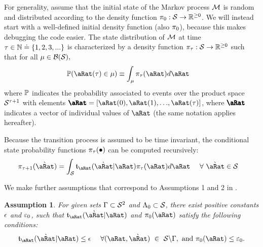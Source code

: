 \documentclass[\econtexRoot/BufferStockTheory.tex]{subfiles}
\begin{document}
For generality, \cite{saDiscrete,saQuantitative} assume that  the initial state of the Markov process $\mathcal{M}$ is random and distributed according to the density function $\pi_{0} : \mathcal{S} \rightarrow \mathbb{R}^{\geq 0}$.  We will instead start with a well-defined initial density function (also $\pi_{0}$), because this makes debugging the code easier.  The state distribution of $\mathcal{M}$ at time $\tau \in \mathbb{N} \doteq  \{1,2,3,...\}$ is characterized by a density function $\pi_{\tau} : \mathcal{S} \rightarrow \mathbb{R}^{\geq 0}$ such that for all $\mu \in \mathcal{B}({\mathcal{S}}),$
\begin{align}
  \PrbEvntSqnc(\pnt(\tAbs) \in \SetPartCnts) & \equiv \int_{\SetPartCnts} \DnsPnt_{\tAbs}(\pnt)d\pnt
\end{align}
where $\mathbb{P}$ indicates the probability associated to events over the product space $\mathcal{S}^{\tau+1}$ with elements $\vctr{\pnt}=[\pnt(0),\pnt(1),{\dots},\pnt(\tAbs)]$, where $\vctr{\pnt}$ indicates a vector of individual values of $\pnt$ (the same notation applies hereafter).

Because the transition process is assumed to be time invariant, the conditional state probability functions $\pi_{\tau}(\bullet)$ can be computed recursively:
\begin{align}
  \DnsPnt_{\tAbs+1}(\Nxt{\pnt}) &= \int_{\SetFullCnts} \DnsPntNxtFmPntNow_{\pnt}(\Nxt{\pnt}|\pnt)\DnsPnt_{\tAbs}(\pnt)d\pnt ~~~~ \forall~\Nxt{\pnt} \in \SetFullCnts \label{eq:stateDensity}
\end{align}

We make further assumptions that correspond to Assumptions 1 and 2 in \cite{saDiscrete}.


\theoremstyle{plain}
\newtheorem{assumption}{Assumption}
\begin{assumption}\label{assn:Bounded} For given sets $\Gamma \subset \mathcal{S}^{2}$ and $\Lambda_{0} \subset \mathcal{S}$, there exist positive constants $\epsilon$ and $\varepsilon_{0}$, such that $\DnsPntNxtFmPntNow_{\pnt}(\Nxt{\pnt}|\pnt) $ and $\DnsPnt_{0}(\pnt)$ satisfy the following conditions:
  \begin{align}
    \DnsPntNxtFmPntNow_{\pnt}(\Nxt{\pnt}|\pnt) \leq \DnsSetNxtFmPntNowBnd ~~~~\forall(\pnt,\Nxt{\pnt})~\in~\SetFullCnts \backslash \KrnPntNxtFmPntNowSetSprtTrnc, \text{~and~} \DnsPnt_{0}(\pnt) \leq \DnsPntBnd_{0}.
  \end{align}
\end{assumption}
\end{document}
